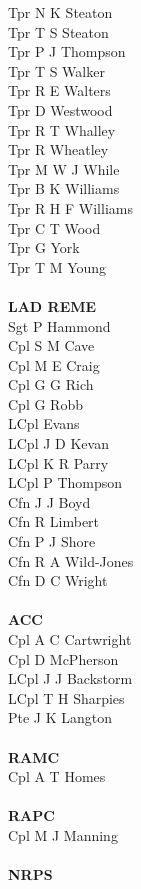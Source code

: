 \begin{multicols}{2}
  Tpr N K Steaton \\
  Tpr T S Steaton \\
  Tpr P J Thompson \\
  Tpr T S Walker \\
  Tpr R E Walters \\
  Tpr D Westwood \\
  Tpr R T Whalley \\
  Tpr R Wheatley \\
  Tpr M W J While \\
  Tpr B K Williams \\
  Tpr R H F Williams \\
  Tpr C T Wood \\
  Tpr G York \\
  Tpr T M Young \\
  \\
  \textbf{LAD REME} \\
  Sgt P Hammond \\
  Cpl S M Cave \\
  Cpl M E Craig \\
  Cpl G G Rich \\
  Cpl G Robb \\
  LCpl Evans \\
  LCpl J D Kevan \\
  LCpl K R Parry \\
  LCpl P Thompson \\
  Cfn J J Boyd \\
  Cfn R Limbert \\
  Cfn P J Shore \\
  Cfn R A Wild-Jones \\
  Cfn D C Wright \\
  \\
  \textbf{ACC} \\
  Cpl A C Cartwright \\
  Cpl D McPherson \\
  LCpl J J Backstorm \\
  LCpl T H Sharpies \\
  Pte J K Langton \\
  \\
  \textbf{RAMC} \\
  Cpl A T Homes \\
  \\
  \textbf{RAPC} \\
  Cpl M J Manning \\
  \\
  \textbf{NRPS} \\

\end{multicols}
